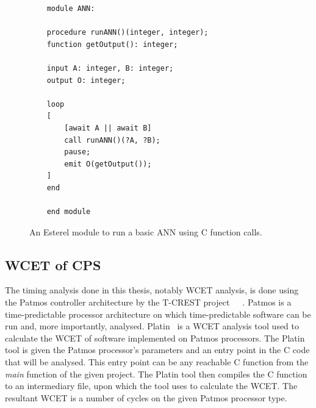 \begin{figure}[h]
	\begin{lstlisting}
	module ANN:
	
	procedure runANN()(integer, integer);
	function getOutput(): integer;
	
	input A: integer, B: integer;
	output O: integer;
	
	loop
	[
		[await A || await B] 
		call runANN()(?A, ?B);
		pause;
		emit O(getOutput());
	]
	end
	
	end module
	\end{lstlisting}
	\caption{An Esterel module to run a basic \ac{ANN} using C function calls.}
	\label{fig:esterel-abro}
\end{figure}

\subsection{\acf{WCET} of \acf{CPS}}
The timing analysis done in this thesis, notably \acf{WCET} analysis, is done using the Patmos controller architecture by the T-CREST project~\cite{TCREST}~\cite{patmos:ppes2011}~\cite{patmos}.
Patmos is a time-predictable processor architecture on which time-predictable software can be run and, more importantly, analysed.
Platin~\cite{compiler:platin:kps15} is a \acf{WCET} analysis tool used to calculate the \ac{WCET} of software implemented on Patmos processors.
The Platin tool is given the Patmos processor's parameters and an entry point in the C code that will be analysed.
This entry point can be any reachable C function from the \textit{main} function of the given project.
The Platin tool then compiles the C function to an intermediary file, upon which the tool uses to calculate the \ac{WCET}.
The resultant \ac{WCET} is a number of cycles on the given Patmos processor type.

